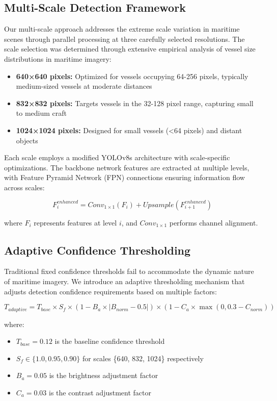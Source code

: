 \documentclass[10pt]{article}
\begin{document}
\subsection{Multi-Scale Detection Framework}

Our multi-scale approach addresses the extreme scale variation in maritime scenes through parallel processing at three carefully selected resolutions. The scale selection was determined through extensive empirical analysis of vessel size distributions in maritime imagery:

\begin{itemize}
\item \textbf{640×640 pixels:} Optimized for vessels occupying 64-256 pixels, typically medium-sized vessels at moderate distances
\item \textbf{832×832 pixels:} Targets vessels in the 32-128 pixel range, capturing small to medium craft
\item \textbf{1024×1024 pixels:} Designed for small vessels (<64 pixels) and distant objects
\end{itemize}

Each scale employs a modified YOLOv8s architecture with scale-specific optimizations. The backbone network features are extracted at multiple levels, with Feature Pyramid Network (FPN) connections ensuring information flow across scales:

\begin{equation}
F_{i}^{enhanced} = Conv_{1×1}(F_i) + Upsample(F_{i+1}^{enhanced})
\end{equation}

where $F_i$ represents features at level $i$, and $Conv_{1×1}$ performs channel alignment.

\subsection{Adaptive Confidence Thresholding}

Traditional fixed confidence thresholds fail to accommodate the dynamic nature of maritime imagery. We introduce an adaptive thresholding mechanism that adjusts detection confidence requirements based on multiple factors:

\begin{equation}
T_{adaptive} = T_{base} \times S_f \times (1 - B_a \times |B_{norm} - 0.5|) \times (1 - C_a \times \max(0, 0.3 - C_{norm}))
\end{equation}

where:
\begin{itemize}
\item $T_{base} = 0.12$ is the baseline confidence threshold
\item $S_f \in \{1.0, 0.95, 0.90\}$ for scales \{640, 832, 1024\} respectively
\item $B_a = 0.05$ is the brightness adjustment factor
\item $C_a = 0.03$ is the contrast adjustment factor
\end{itemize}
\end{document}
